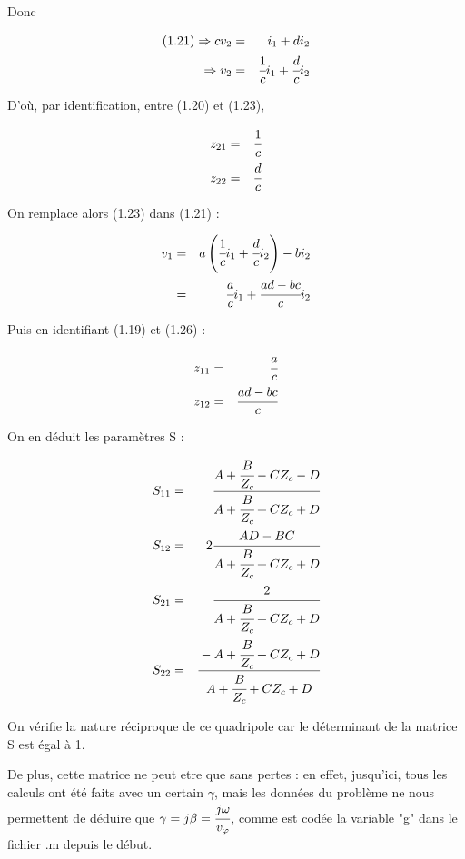 \documentclass[11pt;a4paper;fleqn]{report}
\begin{document}
\begin{itemize}
     Donc

     \begin{eqnarray}
      (1.21) \Rightarrow c v_2 &=& i_1 + d i_2 \nonumber \\
      \Rightarrow v_2 &=& \cfrac{1}{c} i_1 + \cfrac{d}{c} i_2
     \end{eqnarray}

     D'où, par identification, entre (1.20) et (1.23), 

     \begin{eqnarray}
      z_{21} &=& \cfrac{1}{c} \\
      z_{22} &=& \cfrac{d}{c}
     \end{eqnarray}

     On remplace alors (1.23) dans (1.21) :

     \begin{eqnarray}
      v_1 &=& a \left( \cfrac{1}{c} i_1 + \cfrac{d}{c} i_2 \right) - b i_2 \nonumber \\
      &=& \cfrac{a}{c} i_1 + \cfrac{a d - b c}{c} i_2
     \end{eqnarray}

     Puis en identifiant (1.19) et (1.26) :

     \begin{eqnarray}
      z_{11} &=& \cfrac{a}{c} \\
      z_{12} &=& \cfrac{a d - b c}{c}
     \end{eqnarray}

     On en déduit les paramètres S :

     \begin{eqnarray}
      S_{11} &=& \cfrac{A + \cfrac{B}{Z_c} - C Z_c - D}{A+\cfrac{B}{Z_c} +C Z_c +D} \\
      S_{12} &=& 2 \cfrac{A D - B C}{A+\cfrac{B}{Z_c} +C Z_c +D} \\
      S_{21} &=& \cfrac{2}{A+\cfrac{B}{Z_c} +C Z_c +D} \\
      S_{22} &=& \cfrac{-A +\cfrac{B}{Z_c} + C Z_c +D}{A+\cfrac{B}{Z_c} +C Z_c +D}
     \end{eqnarray}
     
     On vérifie la nature réciproque de ce quadripole car le déterminant de la matrice S est égal à 1.

     De plus, cette matrice ne peut etre que sans pertes : en effet, jusqu'ici, tous les calculs ont été faits avec un certain $\gamma$, mais les données du problème ne nous permettent de déduire que $\gamma = j \beta = \cfrac{j \omega}{v_\varphi}$, comme est codée la variable "g" dans le fichier .m depuis le début.
     

\end{itemize}
\end{document}
